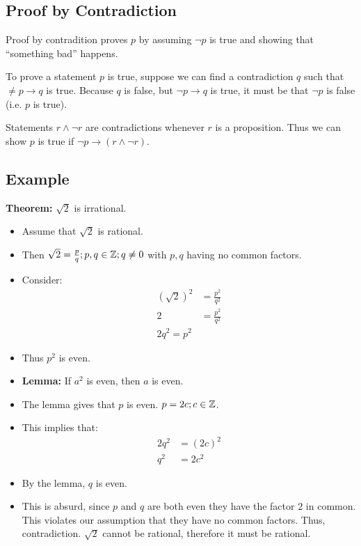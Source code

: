 \documentclass{math}
\begin{document}
\subsection*{Proof by Contradiction}
Proof by contradition proves \( p \) by assuming \( \neg{p} \) is true and
showing that ``something bad'' happens. \par
To prove a statement \( p \) is true, suppose we can find a contradiction
\( q \) such that \( \neq{p} \to q \) is true. Because \( q \) is false,
but \( \neg{p} \to q \) is true, it must be that \( \neg{p} \) is false
(i.e. \( p \) is true). \par
Statements \( r \wedge \neg{r} \) are contradictions whenever \( r \) is a
proposition. Thus we can show \( p \) is true if \( \neg{p} \to
(r \wedge \neg{r}) \).

\subsection*{Example}
\textbf{Theorem:} \( \sqrt{2} \) is irrational.
\begin{itemize}
  \item Assume that \( \sqrt{2} \) is rational.
  \item Then \( \sqrt{2} = \frac{p}{q}; p,q \in \mathbb{Z}; q \neq 0 \) with \( p,q \)
    having no common factors.
  \item Consider:
    \begin{align*}
      (\sqrt{2})^{2} &= \frac{p^{2}}{q^{2}} \\
      2 &= \frac{p^{2}}{q^{2}} \\
      2q^{2} = p^{2}
    \end{align*}
  \item Thus \( p^{2} \) is even.
  \item \textbf{Lemma:} If \( a^{2} \) is even, then \( a \) is even.
  \item The lemma gives that \( p \) is even. \( p = 2c; c \in \mathbb{Z} \).
  \item This implies that:
    \begin{align*}
      2q^{2} &= (2c)^{2} \\
      q^{2} &= 2c^{2}
    \end{align*}
  \item By the lemma, \( q \) is even.
  \item This is absurd, since \( p \) and \( q \) are both even they have
    the factor \( 2 \) in common. This violates our assumption that they
    have no common factors. Thus, contradiction. \( \sqrt{2} \) cannot be
    rational, therefore it must be rational.
\end{itemize}
\end{document}
